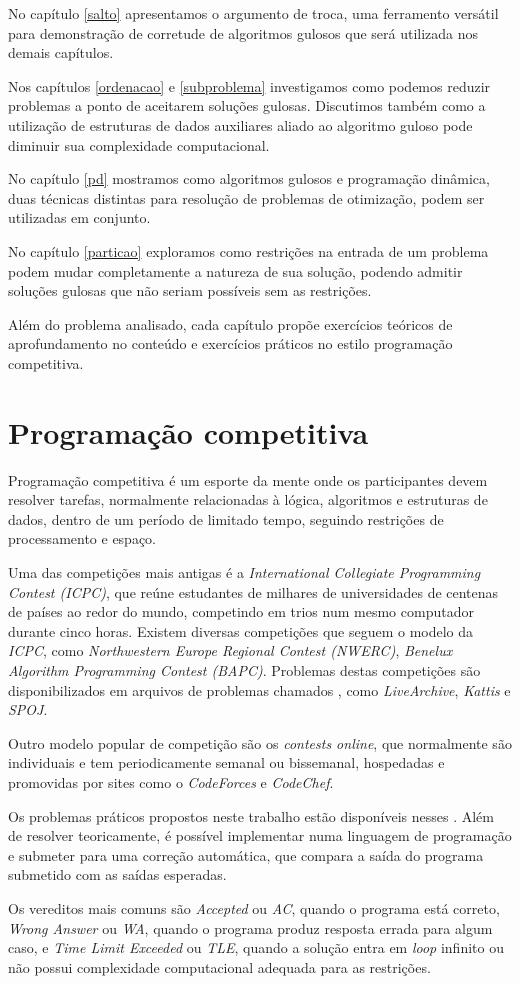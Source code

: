 No capítulo \ref{salto} apresentamos o argumento de troca, uma ferramento versátil para demonstração de corretude de algoritmos gulosos que será utilizada nos demais capítulos.

Nos capítulos \ref{ordenacao} e \ref{subproblema} investigamos como podemos reduzir problemas a ponto de aceitarem soluções gulosas. Discutimos também como a utilização de estruturas de dados auxiliares aliado ao algoritmo guloso pode diminuir sua complexidade computacional.

No capítulo \ref{pd} mostramos como algoritmos gulosos e programação dinâmica, duas técnicas distintas para resolução de problemas de otimização, podem ser utilizadas em conjunto.

No capítulo \ref{particao} exploramos como restrições na entrada de um problema podem mudar completamente a natureza de sua solução, podendo admitir soluções gulosas que não seriam possíveis sem as restrições.

Além do problema analisado, cada capítulo propõe exercícios teóricos de aprofundamento no conteúdo e exercícios práticos no estilo programação competitiva.

\section{Programação competitiva}

Programação competitiva é um esporte da mente onde os participantes devem resolver tarefas, normalmente relacionadas à lógica, algoritmos e estruturas de dados, dentro de um período de limitado tempo, seguindo restrições de processamento e espaço.

Uma das competições mais antigas é a \emph{International Collegiate Programming Contest (ICPC)}, que reúne estudantes de milhares de universidades de centenas de países ao redor do mundo, competindo em trios num mesmo computador durante cinco horas. Existem diversas competições que seguem o modelo da \emph{ICPC}, como \emph{Northwestern Europe Regional Contest (NWERC)}, \emph{Benelux Algorithm Programming Contest (BAPC)}. Problemas destas competições são disponibilizados em arquivos de problemas chamados , como \emph{LiveArchive}, \emph{Kattis} e \emph{SPOJ}.

Outro modelo popular de competição são os \emph{contests online}, que normalmente são individuais e tem periodicamente semanal ou bissemanal, hospedadas e promovidas por sites como o \emph{CodeForces} e \emph{CodeChef}.

Os problemas práticos propostos neste trabalho estão disponíveis nesses . Além de resolver teoricamente, é possível implementar numa linguagem de programação e submeter para uma correção automática, que compara a saída do programa submetido com as saídas esperadas.

Os vereditos mais comuns são \emph{Accepted} ou \emph{AC}, quando o programa está correto, \emph{Wrong Answer} ou \emph{WA}, quando o programa produz resposta errada para algum caso, e \emph{Time Limit Exceeded} ou \emph{TLE}, quando a solução entra em \emph{loop} infinito ou não possui complexidade computacional adequada para as restrições.
